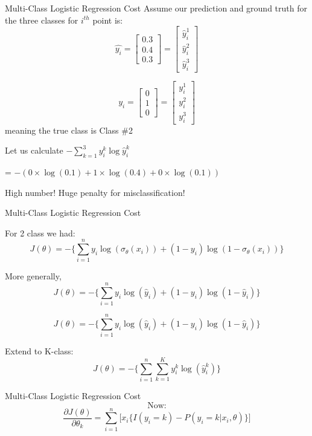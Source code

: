 \documentclass{beamer}
\begin{document}
\begin{frame}{Multi-Class Logistic Regression Cost}
Assume our prediction and ground truth  for the three classes for $i^{th}$ point is:
$$
\hat{y_i} = \begin{bmatrix}
0.3\\0.4\\0.3
\end{bmatrix} = \begin{bmatrix}
\hat{y}_i^1\\\hat{y}_i^2\\\hat{y}_i^3
\end{bmatrix} 
$$

$$
y_i = \begin{bmatrix}
0\\1\\0
\end{bmatrix}=\begin{bmatrix}
y_i^1\\y_i^2\\ y_i^3
\end{bmatrix}
$$
meaning the true class is Class \#2

\pause Let us calculate $-\sum_{k=1}^{3}y_i^k \log{\hat{y}_i^k} $

\pause  = $-(0\times \log(0.1) + 1\times \log(0.4) + 0\times \log(0.1))$

\pause High number! Huge penalty for misclassification!

\end{frame}

\begin{frame}{Multi-Class Logistic Regression Cost}


For 2 class we had:
\begin{equation*}
J(\theta) = -\bigg\{\sum_{i=1}^{n}y_{i}\log(\sigma_{\theta}(x_{i})) + (1 - y_{i})\log(1 - \sigma_{\theta}(x_{i}))\bigg\}
\end{equation*}

\pause More generally, 
\pause \begin{equation*}
J(\theta) = -\bigg\{\sum_{i=1}^{n}y_{i}\log(\hat{y}_i) + (1 - y_{i})\log(1 - \hat{y}_i)\bigg\}
\end{equation*}

\pause \begin{equation*}
J(\theta) = -\bigg\{\sum_{i=1}^{n}y_{i}\log(\hat{y}_i) + (1 - y_{i})\log(1 - \hat{y}_i)\bigg\}
\end{equation*}

Extend to K-class:
\begin{equation*}
J(\theta) = -\bigg\{\sum_{i=1}^{n}\sum_{k=1}^{K}y_{i}^k\log(\hat{y}_{i}^k)\bigg\}
\end{equation*}
\end{frame}
\begin{frame}{Multi-Class Logistic Regression Cost}
\begin{equation*}
\text{Now:}
\end{equation*}
\begin{equation*}
\frac{\partial J(\theta)}{\partial \theta_{k}} = \sum_{i=1}^{n}\bigg[x_{i}\bigg\{I(y_{i} = k) - P(y_{i} = k | x_{i}, \theta)\bigg\}\bigg]
\end{equation*}
\end{frame}
\end{document}
